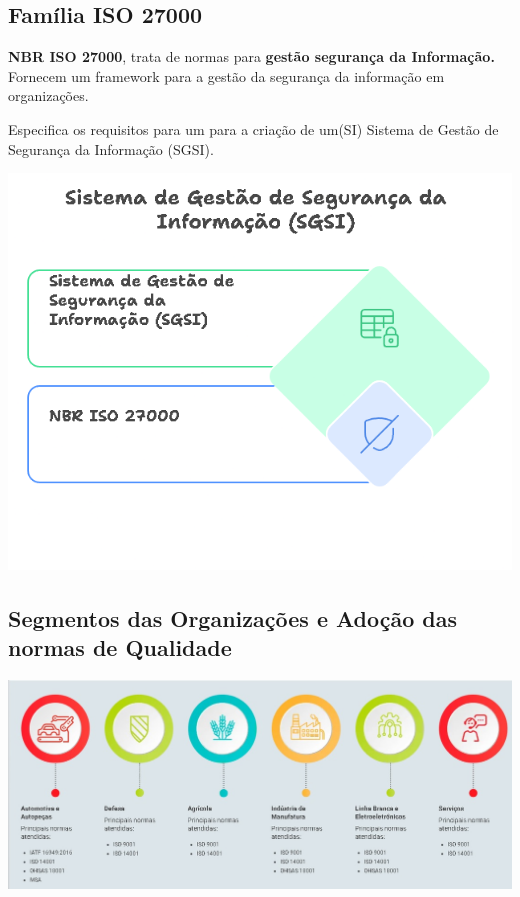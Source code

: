\documentclass[
]{book}
\begin{document}
\subsection{Família ISO 27000}\label{famuxedlia-iso-27000}

\textbf{NBR ISO 27000}, trata de normas para \textbf{gestão segurança da Informação.} Fornecem um framework para a gestão da segurança da informação em organizações.

Especifica os requisitos para um para a criação de um(SI) Sistema de Gestão de Segurança da Informação (SGSI).

\includegraphics{images/qualidade-geral/ISO-27000-SGSI.png}

\subsection{Segmentos das Organizações e Adoção das normas de Qualidade}\label{segmentos-das-organizauxe7uxf5es-e-adouxe7uxe3o-das-normas-de-qualidade}

\includegraphics{images/qualidade-geral/segmentos.jpg}
\end{document}
